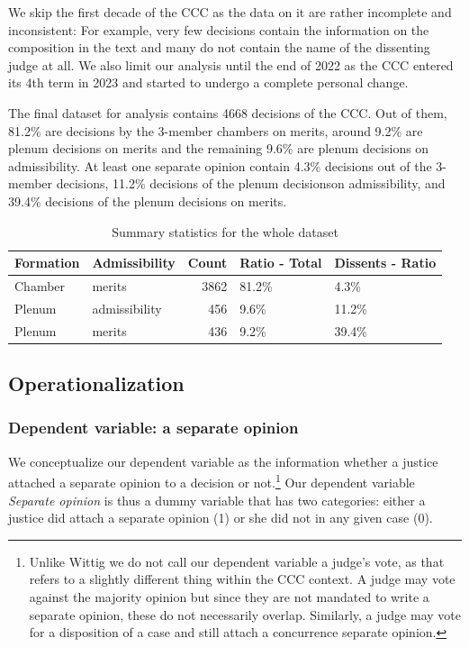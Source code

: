 \documentclass[
  11pt,
]{article}
\begin{document}
We skip the first decade of the CCC as the data on it are rather
incomplete and inconsistent: For example, very few decisions contain the
information on the composition in the text and many do not contain the
name of the dissenting judge at all. We also limit our analysis until
the end of 2022 as the CCC entered its 4th term in 2023 and started to
undergo a complete personal change.

The final dataset for analysis contains 4668 decisions of the CCC. Out
of them, 81.2\% are decisions by the 3-member chambers on merits, around
9.2\% are plenum decisions on merits and the remaining 9.6\% are plenum
decisions on admissibility. At least one separate opinion contain 4.3\%
decisions out of the 3-member decisions, 11.2\% decisions of the plenum
decisionson admissibility, and 39.4\% decisions of the plenum decisions
on merits.

\begin{longtable}[t]{llrll}
\caption{\label{tab:unnamed-chunk-2}Summary statistics for the whole dataset}\\
\toprule
\textbf{Formation} & \textbf{Admissibility} & \textbf{Count} & \textbf{Ratio - Total} & \textbf{Dissents - Ratio}\\
\midrule
Chamber & merits & 3862 & 81.2\% & 4.3\%\\
Plenum & admissibility & 456 & 9.6\% & 11.2\%\\
Plenum & merits & 436 & 9.2\% & 39.4\%\\
\bottomrule
\end{longtable}

\hypertarget{operationalization}{%
\subsection{Operationalization}\label{operationalization}}

\hypertarget{dependent-variable-a-separate-opinion}{%
\subsubsection{Dependent variable: a separate
opinion}\label{dependent-variable-a-separate-opinion}}

We conceptualize our dependent variable as the information whether a
justice attached a separate opinion to a decision or not.\footnote{Unlike
  Wittig we do not call our dependent variable a judge's vote, as that
  refers to a slightly different thing within the CCC context. A judge
  may vote against the majority opinion but since they are not mandated
  to write a separate opinion, these do not necessarily overlap.
  Similarly, a judge may vote for a disposition of a case and still
  attach a concurrence separate opinion.} Our dependent variable
\emph{Separate opinion} is thus a dummy variable that has two
categories: either a justice did attach a separate opinion (1) or she
did not in any given case (0).
\end{document}
